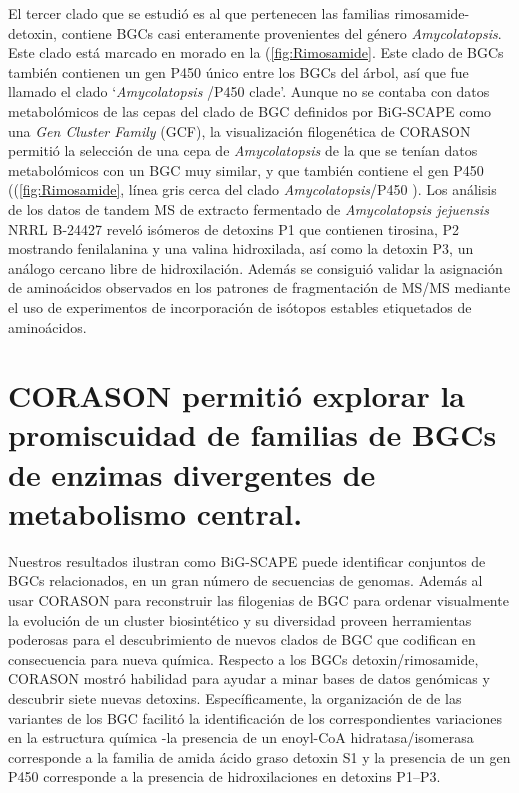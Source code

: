 \documentclass[12pt,twoside]{reedthesis}
\begin{document}
  El tercer clado que se estudió es al que pertenecen las familias
  rimosamide-detoxin, contiene BGCs casi enteramente provenientes del
  género \emph{Amycolatopsis}. Este clado está marcado en morado en la
  (\autoref{fig:Rimosamide}. Este clado de BGCs también contienen un gen
  P450 único entre los BGCs del árbol, así que fue llamado el clado
  `\emph{Amycolatopsis} /P450 clade'. Aunque no se contaba con datos
  metabolómicos de las cepas del clado de BGC definidos por BiG-SCAPE como
  una \emph{Gen Cluster Family} (GCF), la visualización filogenética de
  CORASON permitió la selección de una cepa de \emph{Amycolatopsis} de la
  que se tenían datos metabolómicos con un BGC muy similar, y que también
  contiene el gen P450 ((\autoref{fig:Rimosamide}, línea gris cerca del
  clado \emph{Amycolatopsis}/P450 ). Los análisis de los datos de tandem
  MS de extracto fermentado de \emph{Amycolatopsis jejuensis} NRRL B-24427
  reveló isómeros de detoxins P1 que contienen tirosina, P2 mostrando
  fenilalanina y una valina hidroxilada, así como la detoxin P3, un
  análogo cercano libre de hidroxilación. Además se consiguió validar la
  asignación de aminoácidos observados en los patrones de fragmentación de
  MS/MS mediante el uso de experimentos de incorporación de isótopos
  estables etiquetados de aminoácidos.
  
  \section{CORASON permitió explorar la promiscuidad de familias de BGCs
  de enzimas divergentes de metabolismo
  central.}\label{corason-permitio-explorar-la-promiscuidad-de-familias-de-bgcs-de-enzimas-divergentes-de-metabolismo-central.}
  
  Nuestros resultados ilustran como BiG-SCAPE puede identificar conjuntos
  de BGCs relacionados, en un gran número de secuencias de genomas. Además
  al usar CORASON para reconstruir las filogenias de BGC para ordenar
  visualmente la evolución de un cluster biosintético y su diversidad
  proveen herramientas poderosas para el descubrimiento de nuevos clados
  de BGC que codifican en consecuencia para nueva química. Respecto a los
  BGCs detoxin/rimosamide, CORASON mostró habilidad para ayudar a minar
  bases de datos genómicas y descubrir siete nuevas detoxins.
  Específicamente, la organización de de las variantes de los BGC facilitó
  la identificación de los correspondientes variaciones en la estructura
  química -la presencia de un enoyl-CoA hidratasa/isomerasa corresponde a
  la familia de amida ácido graso detoxin S1 y la presencia de un gen P450
  corresponde a la presencia de hidroxilaciones en detoxins P1--P3.
  
\end{document}
